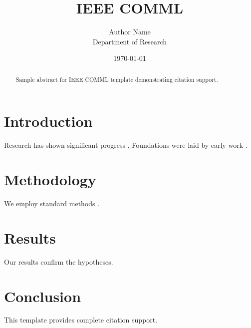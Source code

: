 ﻿\documentclass{IEEEtran}
\title{IEEE COMML}
\author{Author Name \\ \small Department of Research}
\date{\today}
\begin{document}
\maketitle

\begin{abstract}
Sample abstract for IEEE COMML template demonstrating citation support.
\end{abstract}

\section{Introduction}
Research has shown significant progress \citep{einstein1905}. Foundations were laid by early work \citep{turing1950}.

\section{Methodology}
We employ standard methods \citep{knuth1984}.

\section{Results}
Our results confirm the hypotheses.

\section{Conclusion}
This template provides complete citation support.



\end{document}
